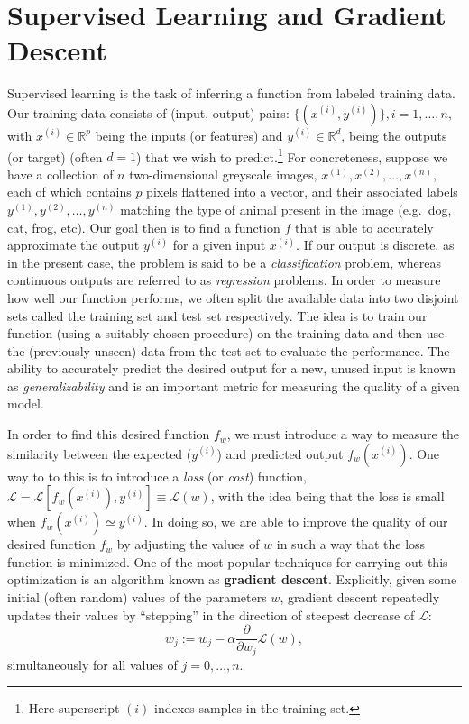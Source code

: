 \documentclass[../main.tex]{subfiles}
\begin{document}
\section{Supervised Learning and Gradient Descent}%
\label{sec:supervised_learning_gradient_descent}
Supervised learning is the task of inferring a function from labeled training data.
%
Our training data consists of (input, output) pairs: $\{(x^{(i)}, y^{(i)})\}, i = 1, \ldots, n$, with $x^{(i)} \in
\mathbb{R}^{p}$ being the inputs (or features) and $y^{(i)} \in \mathbb{R}^{d}$, being the outputs (or target) (often
$d = 1$) that we wish to predict.\footnote{Here superscript $(i)$ indexes samples in the training set.}
%
For concreteness, suppose we have a collection of $n$ two-dimensional greyscale images, $x^{(1)}, x^{(2)}, \ldots,
x^{(n)}$, each of which contains $p$ pixels flattened into a vector, and their associated labels $y^{(1)}, y^{(2)},
\ldots, y^{(n)}$ matching the type of animal present in the image (e.g.\ dog, cat, frog, etc).
%
Our goal then is to find a function $f$ that is able to accurately approximate the output $y^{(i)}$ for a given input
$x^{(i)}$.
%
If our output is discrete, as in the present case, the problem is said to be a \emph{classification} problem, whereas
continuous outputs are referred to as \emph{regression} problems.
%
In order to measure how well our function performs, we often split the available data into two disjoint sets called the
training set and test set respectively.
%
The idea is to train our function (using a suitably chosen procedure) on the training data and then use the (previously
unseen) data from the test set to evaluate the performance.
%
The ability to accurately predict the desired output for a new, unused input is known as \emph{generalizability} and is
an important metric for measuring the quality of a given model.

In order to find this desired function $f_w$, we must introduce a way to measure the similarity between the expected
($y^{(i)}$) and predicted output $f_{w}(x^{(i)})$.
%
One way to to this is to introduce a \emph{loss} (or \emph{cost}) function, $\mathcal{L} =
\mathcal{L}[f_{w}(x^{(i)}), y^{(i)}] \equiv \mathcal{L}(w)$, with the idea being that the loss is small when $f_{w}(x^{(i)})
\simeq y^{(i)}$.
%
In doing so, we are able to improve the quality of our desired function $f_w$ by adjusting the values of $w$ in such a
way that the loss function is minimized.
%
One of the most popular techniques for carrying out this optimization is an algorithm known as \textbf{gradient
descent}.
%
Explicitly, given some initial (often random) values of the parameters $w$, gradient descent repeatedly updates their
values by ``stepping'' in the direction of steepest decrease of $\mathcal{L}$:
%
\begin{equation}
  w_{j} := w_{j} - \alpha \frac{\partial}{\partial w_{j}} \mathcal{L}(w), %
\end{equation}
%
simultaneously for all values of $j = 0, \ldots, n$.
\end{document}
